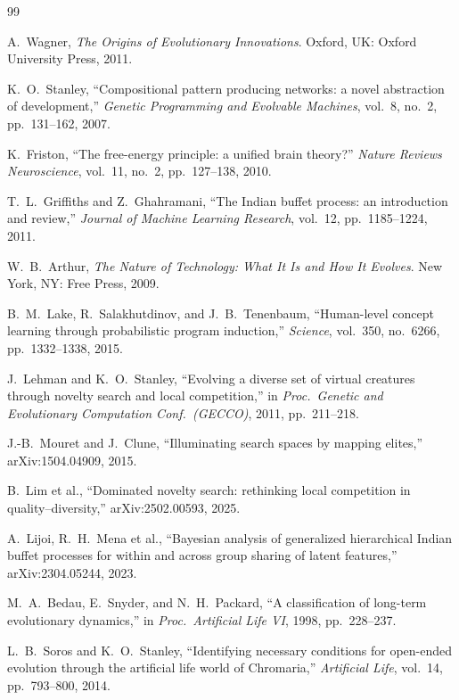 \documentclass[journal,onecolumn,11pt]{IEEEtran}
\theoremstyle{definition}
\begin{document}
\begin{thebibliography}{99}

A.~Wagner, \emph{The Origins of Evolutionary Innovations}.
Oxford, UK: Oxford University Press, 2011.

K.~O.~Stanley,
``Compositional pattern producing networks: a novel abstraction of development,''
\emph{Genetic Programming and Evolvable Machines}, vol.~8, no.~2, pp.~131--162, 2007.

K.~Friston,
``The free-energy principle: a unified brain theory?''
\emph{Nature Reviews Neuroscience}, vol.~11, no.~2, pp.~127--138, 2010.

T.~L.~Griffiths and Z.~Ghahramani,
``The Indian buffet process: an introduction and review,''
\emph{Journal of Machine Learning Research}, vol.~12, pp.~1185--1224, 2011.

W.~B.~Arthur, \emph{The Nature of Technology: What It Is and How It Evolves}.
New York, NY: Free Press, 2009.

B.~M.~Lake, R.~Salakhutdinov, and J.~B.~Tenenbaum,
``Human-level concept learning through probabilistic program induction,''
\emph{Science}, vol.~350, no.~6266, pp.~1332--1338, 2015.

J.~Lehman and K.~O.~Stanley,
``Evolving a diverse set of virtual creatures through novelty search and local competition,''
in \emph{Proc.\ Genetic and Evolutionary Computation Conf.\ (GECCO)}, 2011, pp.~211--218.

J.-B.~Mouret and J.~Clune,
``Illuminating search spaces by mapping elites,''
arXiv:1504.04909, 2015.

B.~Lim et al.,
``Dominated novelty search: rethinking local competition in quality--diversity,''
arXiv:2502.00593, 2025.

A.~Lijoi, R.~H.~Mena et al.,
``Bayesian analysis of generalized hierarchical Indian buffet processes for within and across group sharing of latent features,''
arXiv:2304.05244, 2023.

M.~A.~Bedau, E.~Snyder, and N.~H.~Packard,
``A classification of long-term evolutionary dynamics,''
in \emph{Proc.\ Artificial Life VI}, 1998, pp.~228--237.

L.~B.~Soros and K.~O.~Stanley,
``Identifying necessary conditions for open-ended evolution through the artificial life world of Chromaria,''
\emph{Artificial Life}, vol.~14, pp.~793--800, 2014.


\end{thebibliography}
\end{document}

